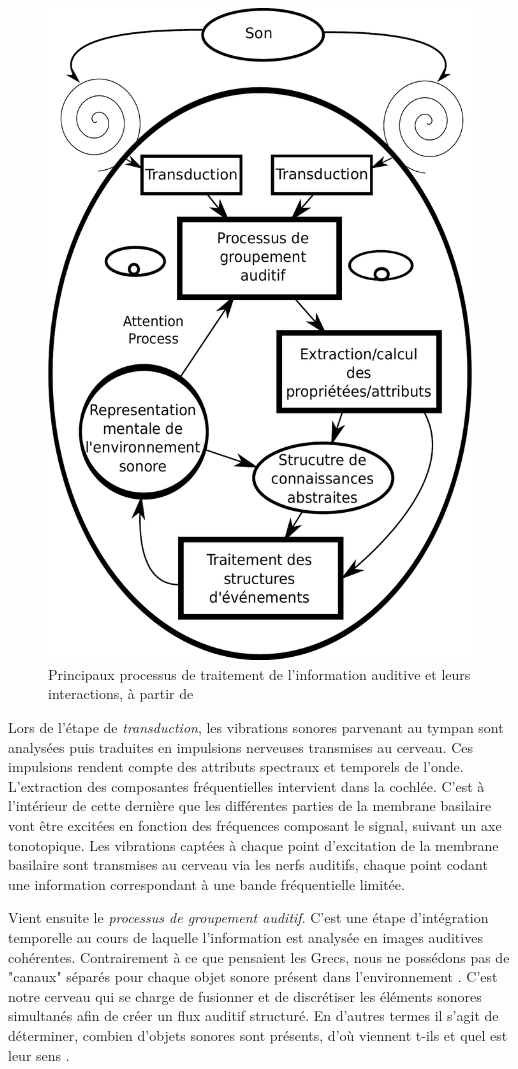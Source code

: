 \begin{figure}[bth]
        \myfloatalign
        \includegraphics[width=.6\linewidth]{gfx/traitementSonMcAdamsBigand}
        \caption[Principaux processus de traitement de l'information auditive et leurs interactions]{Principaux processus de traitement de l'information auditive et leurs interactions, à partir de \citep{mcadams1994penser}}\label{fig:traitementSonMcAdamsBigand}
\end{figure}

Lors de l'étape de \emph{transduction}, les vibrations sonores parvenant au tympan sont analysées puis traduites en impulsions nerveuses transmises au cerveau. Ces impulsions rendent compte des attributs spectraux et temporels de l'onde. L'extraction des composantes fréquentielles intervient dans la cochlée. C'est à l'intérieur de cette dernière que les différentes parties de la membrane basilaire vont être excitées en fonction des fréquences composant le signal, suivant un axe tonotopique. Les vibrations captées à chaque point d’excitation de la membrane basilaire sont transmises au cerveau via les nerfs auditifs, chaque point codant une information correspondant à une bande fréquentielle limitée. 

Vient ensuite le \emph{processus de groupement auditif}. C'est une étape d'intégration temporelle au cours de laquelle l'information est analysée en images auditives cohérentes. Contrairement à ce que pensaient les Grecs, nous ne possédons pas de "canaux" séparés pour chaque objet sonore présent dans l'environnement \citep{yost1994fundamentals}. C'est notre cerveau qui se charge de fusionner et de discrétiser les éléments sonores simultanés afin de créer un flux auditif structuré. En d'autres termes il s'agit de déterminer, combien d'objets sonores sont présents, d'où viennent t-ils et quel est leur sens . 



